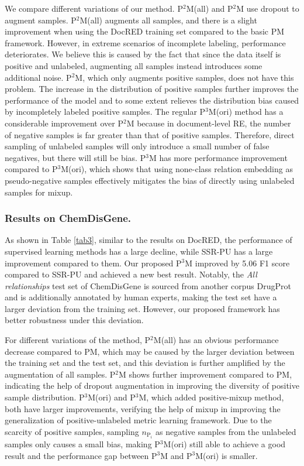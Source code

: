 \documentclass[letterpaper]{article} %
\begin{document}
We compare different variations of our method. P$^{2}$M(all) and P$^{2}$M use dropout to augment samples. P$^{2}$M(all) augments all samples, and there is a slight improvement when using the DocRED training set compared to the basic PM framework. However, in extreme scenarios of incomplete labeling, performance deteriorates. We believe this is caused by the fact that since the data itself is positive and unlabeled, augmenting all samples instead introduces some additional noise. P$^{2}$M, which only augments positive samples, does not have this problem. The increase in the distribution of positive samples further improves the performance of the model and to some extent relieves the distribution bias caused by incompletely labeled positive samples. The regular P$^{3}$M(ori) method has a considerable improvement over P$^{2}$M because in document-level RE, the number of negative samples is far greater than that of positive samples. Therefore, direct sampling of unlabeled samples will only introduce a small number of false negatives, but there will still be bias. P$^{3}$M has more performance improvement compared to P$^{3}$M(ori), which shows that using none-class relation embedding as pseudo-negative samples effectively mitigates the bias of directly using unlabeled samples for mixup.

\subsubsection{Results on ChemDisGene.}
As shown in Table \ref{tab3}, similar to the results on DocRED, the performance of supervised learning methods has a large decline, while SSR-PU has a large improvement compared to them. Our proposed P$^{3}$M improved by 5.06 F1 score compared to SSR-PU and achieved a new best result. Notably, the \emph{All relationships} test set of ChemDisGene is sourced from another corpus DrugProt ~\cite{miranda2021overview} and is additionally annotated by human experts, making the test set have a larger deviation from the training set. However, our proposed framework has better robustness under this deviation.

For different variations of the method, P$^2$M(all) has an obvious performance decrease compared to PM, which may be caused by the larger deviation between the training set and the test set, and this deviation is further amplified by the augmentation of all samples. P$^2$M shows further improvement compared to PM, indicating the help of dropout augmentation in improving the diversity of positive sample distribution. P$^3$M(ori) and P$^3$M, which added positive-mixup method, both have larger improvements, verifying the help of mixup in improving the generalization of positive-unlabeled metric learning framework. Due to the scarcity of positive samples, sampling $n_{\mathrm{P}_{i}}$ as negative samples from the unlabeled samples only causes a small bias, making P$^3$M(ori) still able to achieve a good result and the performance gap between P$^3$M and P$^3$M(ori) is smaller.
\end{document}
